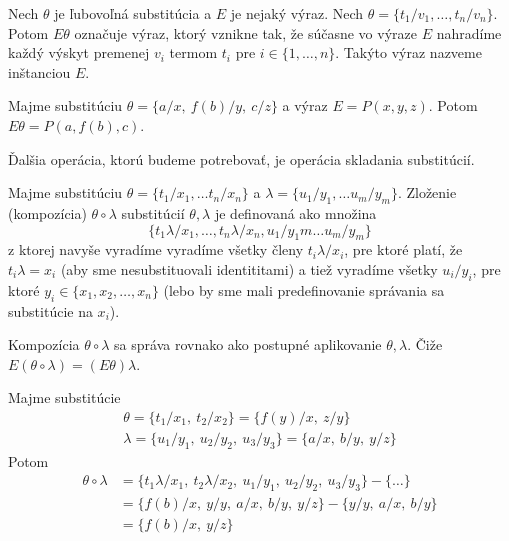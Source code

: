 \begin{definicia}
    Nech $\theta$ je ľubovoľná substitúcia a $E$ je nejaký výraz.
    Nech $\theta = \{ t_1/v_1, \dots, t_n/v_n\}$.
    Potom $E\theta$ označuje výraz, ktorý vznikne tak,
    že súčasne vo výraze $E$ nahradíme každý výskyt premenej $v_i$ termom $t_i$
    pre $i \in \{1,\dots,n\}$. Takýto výraz nazveme inštanciou $E$.
\end{definicia}

\begin{priklad}
    Majme substitúciu $\theta=\{a/x,\ f(b)/y,\ c/z\}$
    a výraz $E = P(x, y, z)$.
    Potom $E\theta = P(a, f(b), c)$.
\end{priklad}

\medskip
\noindent
Ďalšia operácia, ktorú budeme potrebovať, je operácia skladania
substitúcií.

\begin{definicia}
    Majme substitúciu $\theta = \{t_1/x_1, \ldots t_n/x_n\}$ a
    $\lambda = \{ u_1/y_1, \ldots u_m/y_m \}$.
    Zloženie (kompozícia) $\theta \circ \lambda$ substitúcií
    $\theta,\lambda$ je definovaná ako množina
    \begin{equation*}
        \{t_1 \lambda/x_1, \dots, t_n \lambda/x_n, u_1/y_1m \dots u_m/y_m \}
    \end{equation*}
    z ktorej navyše vyradíme vyradíme všetky členy $t_i\lambda/x_i$,
    pre ktoré platí, že $t_i \lambda = x_i$ (aby sme nesubstituovali
    identititami)
    a tiež vyradíme všetky $u_i/y_i$,
    pre ktoré $y_i \in \{x_1, x_2, \dots, x_n\}$ (lebo by sme mali
    predefinovanie správania sa substitúcie na $x_i$).
\end{definicia}

\begin{poznamka}
    Kompozícia $\theta \circ \lambda$ sa správa rovnako ako postupné
    aplikovanie $\theta, \lambda$. Čiže
    $E(\theta \circ \lambda) = (E\theta)\lambda$.
\end{poznamka}

\begin{priklad}
    Majme substitúcie
    \begin{align*}
        \theta = \{t_1/x_1,\ t_2/x_2\} = \{ f(y)/x,\ z/y\} \\
        \lambda = \{u_1/y_1,\ u_2/y_2,\ u_3/y_3\} = \{ a/x,\ b/y,\ y/z\}
    \end{align*}
    Potom
    \begin{equation*}
    \begin{split}
        \theta \circ \lambda &= 
            \{ t_1 \lambda / x_1,\ t_2\lambda/x_2,\
            u_1/y_1,\ u_2/y_2,\ u_3/y_3\} - \{\dots\} \\ 
        &= \{f(b)/x,\ y/y,\ a/x,\ b/y,\ y/z\} - \{y/y,\ a/x,\ b/y\} \\
        &= \{f(b)/x,\ y/z\}
    \end{split}
    \end{equation*}
\end{priklad}

